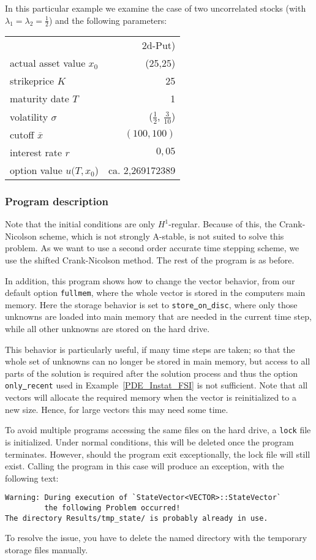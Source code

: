 In this particular example we examine the case of two uncorrelated stocks (with $\lambda_1=\lambda_2=\frac12$) and the following parameters:
 \begin{table}[hb]
    \centering
    \begin{tabular}{lr}
      \toprule 
 & 2d-Put)\\
       \cmidrule(l){2-2}
	 actual asset value $x_0$ 	&  (25,25)\\
	 strikeprice $K$			&  25 \\
	 maturity date $T$ 			& 1 \\
	 volatility $\sigma$		&  ($\frac12$, $\frac 3{10}$) \\
	 cutoff $\overline x$		& $(100,100)$\\
	 interest rate $r$ 				&  $0{,}05$\\
	 option value $u(T,x_0$)			& ca.  2{,}269172389 \\
      \bottomrule
    \end{tabular}
  \end{table}

\subsubsection{Program description}
Note that the initial conditions are only $H^1$-regular. Because of this, 
the Crank-Nicolson scheme, which is not strongly A-stable, is not suited to solve 
this problem. As we want to use a second order accurate time stepping scheme, we use 
the shifted Crank-Nicolson method. The rest of the program is as before.

In addition, this program shows how to change the vector behavior, from our
default option \texttt{fullmem}, where the whole vector
is stored in the computers main memory. Here the storage behavior is set to 
\texttt{store\underline{ }on\underline{ }disc}, where only those unknowns are loaded into 
main memory that are needed in the current time step, while all other 
unknowns are stored on the hard drive. 

This behavior is particularly useful, if many time steps are taken; so that the 
whole set of unknowns can no longer be stored in main memory, but access to all
parts of the solution is required after the solution process and thus the 
option \texttt{only\underline{ }recent} used in Example~\ref{PDE_Instat_FSI} is not sufficient.
Note that all vectors 
will allocate the required memory when the vector is reinitialized to a new size.
Hence, for large vectors this may need some time.

To avoid multiple programs accessing the same files on the hard drive, a 
\texttt{lock} file is initialized. Under normal conditions, this will be deleted 
once the program terminates. However, should the program exit exceptionally, the 
lock file will still exist. Calling the program in this case will produce an 
exception, with the following text:
\begin{verbatim}
Warning: During execution of `StateVector<VECTOR>::StateVector` 
         the following Problem occurred!
The directory Results/tmp_state/ is probably already in use.
\end{verbatim}
To resolve the issue, you have to delete the named directory with the 
temporary storage files manually.
